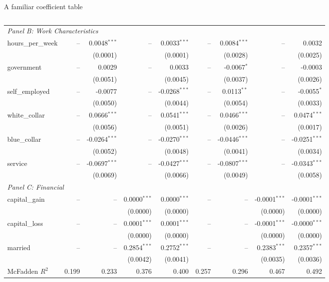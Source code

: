 \documentclass[aspectratio=169]{beamer}
\begin{document}
\begin{frame}{A familiar coefficient table}
\begin{columns}[c]
\begin{column}{0.8\textwidth}
\begin{adjustbox}{max width=\textwidth, max totalheight=0.93\textheight}
\begin{threeparttable}
\begin{tabular}{lrrrrrrrr}
							\midrule
							\multicolumn{9}{l}{\textit{Panel B: Work Characteristics}} \\
							\quad hours\_per\_week & -- & 0.0048$^{***}$ & -- & 0.0033$^{***}$ & -- & 0.0084$^{***}$ & -- & 0.0032 \\
							& & (0.0001) & & (0.0001) & & (0.0028) & & (0.0025) \\
							\quad government & -- & 0.0029 & -- & 0.0033 & -- & -0.0067$^{*}$ & -- & -0.0003 \\
							& & (0.0051) & & (0.0045) & & (0.0037) & & (0.0026) \\
							\quad self\_employed & -- & -0.0077 & -- & -0.0268$^{***}$ & -- & 0.0113$^{**}$ & -- & -0.0055$^{*}$ \\
							& & (0.0050) & & (0.0044) & & (0.0054) & & (0.0033) \\
							\quad white\_collar & -- & 0.0666$^{***}$ & -- & 0.0541$^{***}$ & -- & 0.0466$^{***}$ & -- & 0.0474$^{***}$ \\
							& & (0.0056) & & (0.0051) & & (0.0026) & & (0.0017) \\
							\quad blue\_collar & -- & -0.0264$^{***}$ & -- & -0.0270$^{***}$ & -- & -0.0446$^{***}$ & -- & -0.0251$^{***}$ \\
							& & (0.0052) & & (0.0048) & & (0.0041) & & (0.0034) \\
							\quad service & -- & -0.0697$^{***}$ & -- & -0.0427$^{***}$ & -- & -0.0807$^{***}$ & -- & -0.0343$^{***}$ \\
							& & (0.0069) & & (0.0066) & & (0.0049) & & (0.0058) \\
							\midrule
							\multicolumn{9}{l}{\textit{Panel C: Financial}} \\
							\quad capital\_gain & -- & -- & 0.0000$^{***}$ & 0.0000$^{***}$ & -- & -- & -0.0001$^{***}$ & -0.0001$^{***}$ \\
							& & & (0.0000) & (0.0000) & & & (0.0000) & (0.0000) \\
							\quad capital\_loss & -- & -- & 0.0001$^{***}$ & 0.0001$^{***}$ & -- & -- & -0.0001$^{***}$ & -0.0000$^{***}$ \\
							& & & (0.0000) & (0.0000) & & & (0.0000) & (0.0000) \\
							\quad married & -- & -- & 0.2854$^{***}$ & 0.2752$^{***}$ & -- & -- & 0.2383$^{***}$ & 0.2357$^{***}$ \\
							& & & (0.0042) & (0.0041) & & & (0.0035) & (0.0036) \\
							\midrule
							McFadden $R^2$ & 0.199 & 0.233 & 0.376 & 0.400 & 0.257 & 0.296 & 0.467 & 0.492 \\

\end{tabular}
\end{threeparttable}
\end{adjustbox}
\end{column}
\end{columns}
\end{frame}
\end{document}
